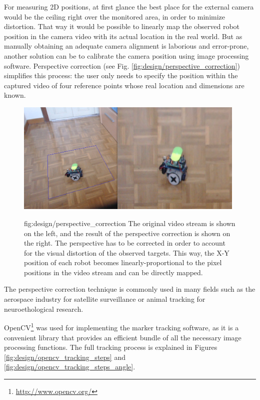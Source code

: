 For measuring 2D positions, at first glance the best place for the external camera would be the ceiling right over the monitored area, in order to minimize distortion.
That way it would be possible to linearly map the observed robot position in the camera video with its actual location in the real world.
But as manually obtaining an adequate camera alignment is laborious and error-prone, another solution can be to calibrate the camera position using image processing software. Perspective correction
(see Fig. \ref{fig:design/perspective_correction})
simplifies this process: the user only needs to specify the position within the captured video of four reference points whose real location and dimensions are known.
\begin{figure}[h!]
\centerline{\mbox{\includegraphics[width=11cm]{images/design/perspective_correction.png}}}
{fig:design/perspective_correction}{
The original video stream is shown on the left, and the result of the perspective correction is shown on the right. The perspective has to be corrected in order to account for the visual distortion of the observed targets. This way, the X-Y position of each robot becomes linearly-proportional to the pixel positions in the video stream and can be directly mapped.
}
\end{figure}
The perspective correction technique is commonly used in many fields such as the aerospace industry for satellite surveillance or animal tracking for neuroethological research.

OpenCV\footnote{\url{http://www.opencv.org/}} was used for implementing the marker tracking software, as it is a convenient library that provides an efficient bundle of all the necessary image processing functions.
The full tracking process is explained in Figures \ref{fig:design/opencv_tracking_steps} and \ref{fig:design/opencv_tracking_steps_angle}.



